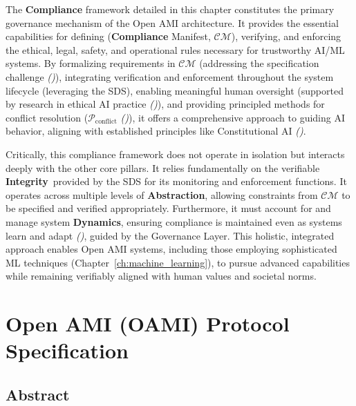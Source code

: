 \documentclass[12pt,a4paper]{report}
\renewcommand{\citep}[1]{\textit{\scriptsize{(\cite{#1})}}}
\newcommand{\Integrity}{\textbf{Integrity}}
\newcommand{\Abstraction}{\textbf{Abstraction}}
\newcommand{\Dynamics}{\textbf{Dynamics}}
\begin{document}
	The \textbf{Compliance} framework detailed in this chapter constitutes the primary governance mechanism of the Open AMI architecture. It provides the essential capabilities for defining (\textbf{Compliance} Manifest, $\mathcal{CM}$), verifying, and enforcing the ethical, legal, safety, and operational rules necessary for trustworthy AI/ML systems. By formalizing requirements in $\mathcal{CM}$ (addressing the specification challenge \citep{Kovac2025SpecGaming}), integrating verification and enforcement throughout the system lifecycle (leveraging the SDS), enabling meaningful human oversight (supported by research in ethical AI practice \citep{Crossing_Principle_Practice_Gap_2024}), and providing principled methods for conflict resolution ($\mathcal{P}_{\text{conflict}}$ \citep{Sekrst2024Guardrails}), it offers a comprehensive approach to guiding AI behavior, aligning with established principles like Constitutional AI \citep{Bai2022ConstitutionalAI}.
	
	Critically, this compliance framework does not operate in isolation but interacts deeply with the other core pillars. It relies fundamentally on the verifiable \Integrity\ provided by the SDS for its monitoring and enforcement functions. It operates across multiple levels of \Abstraction, allowing constraints from $\mathcal{CM}$ to be specified and verified appropriately. Furthermore, it must account for and manage system \Dynamics, ensuring compliance is maintained even as systems learn and adapt \citep{Wang2024ContinualLearningSurvey}, guided by the Governance Layer. This holistic, integrated approach enables Open AMI systems, including those employing sophisticated ML techniques (Chapter~\ref{ch:machine_learning}), to pursue advanced capabilities while remaining verifiably aligned with human values and societal norms.
	
		\appendix
	
	\chapter{Open AMI (OAMI) Protocol Specification}
	\label{app:protocol_spec}
	
	\section{Abstract}
	
\end{document}

